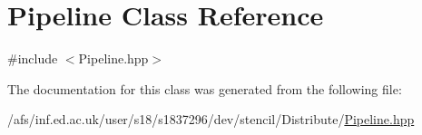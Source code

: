 \hypertarget{classPipeline}{\section{Pipeline Class Reference}
\label{classPipeline}
}


{\ttfamily \#include $<$Pipeline.\-hpp$>$}



The documentation for this class was generated from the following file\-:\begin{DoxyCompactItemize}
\item 
/afs/inf.\-ed.\-ac.\-uk/user/s18/s1837296/dev/stencil/\-Distribute/\hyperlink{Pipeline_8hpp}{Pipeline.\-hpp}\end{DoxyCompactItemize}
